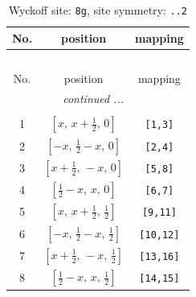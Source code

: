 \documentclass[fleqn,8pt]{jsarticle}
\begin{document}
\begin{longtable}{ccc}
\caption{Wyckoff site: {\tt 8g}, site symmetry: {\tt ..2}}
 \\
 \hline \hline
No. & position & mapping \\ \hline \endfirsthead

\multicolumn{2}{l}{\tablename\ \thetable{}} \\
 \hline \hline
No. & position & mapping \\ \hline \endhead

 \hline \hline
\multicolumn{2}{r}{\footnotesize\it continued ...} \\ \endfoot

 \hline \hline
\multicolumn{2}{r}{} \\ \endlastfoot

1 & $\left[ x,\, x + \frac{1}{2},\, 0 \right]$ & {\tt [1,3]} \\ \hline
2 & $\left[ - x,\, \frac{1}{2} - x,\, 0 \right]$ & {\tt [2,4]} \\ \hline
3 & $\left[ x + \frac{1}{2},\, - x,\, 0 \right]$ & {\tt [5,8]} \\ \hline
4 & $\left[ \frac{1}{2} - x,\, x,\, 0 \right]$ & {\tt [6,7]} \\ \hline
5 & $\left[ x,\, x + \frac{1}{2},\, \frac{1}{2} \right]$ & {\tt [9,11]} \\ \hline
6 & $\left[ - x,\, \frac{1}{2} - x,\, \frac{1}{2} \right]$ & {\tt [10,12]} \\ \hline
7 & $\left[ x + \frac{1}{2},\, - x,\, \frac{1}{2} \right]$ & {\tt [13,16]} \\ \hline
8 & $\left[ \frac{1}{2} - x,\, x,\, \frac{1}{2} \right]$ & {\tt [14,15]} \\
\end{longtable}
\renewcommand{\arraystretch}{1.2}
\end{document}

